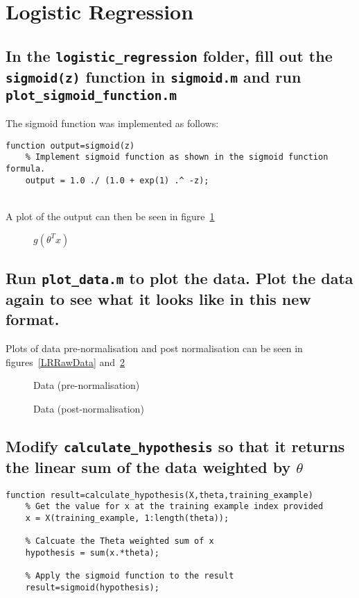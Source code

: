 \documentclass[titlepage]{scrartcl}
\newcommand{\code}[1]{\texttt{#1}}
\begin{document}
\section{Logistic Regression}
\subsection{In the \code{logistic\_regression} folder, fill out the
    \code{sigmoid(z)} function in \code{sigmoid.m} and run
\code{plot\_sigmoid\_function.m}}
The sigmoid function was implemented as follows:\\
\begin{lstlisting}
function output=sigmoid(z)
    % Implement sigmoid function as shown in the sigmoid function formula.
    output = 1.0 ./ (1.0 + exp(1) .^ -z);
\end{lstlisting}\leavevmode \\
A plot of the output can then be seen in figure~\ref{sigmoid}
\begin{figure}
    \caption{$g(\theta^Tx)$}
    \label{sigmoid}
\end{figure}

\subsection{Run \code{plot\_data.m} to plot the data. Plot the data again to
see what it looks like in this new format.}
Plots of data pre-normalisation and post normalisation can be seen in
figures~\ref{LRRawData} and~\ref{LRNormalisedData}

\begin{figure}
    \caption{Data (pre-normalisation)}
    \label{LRRawData}
    \caption{Data (post-normalisation)}
    \label{LRNormalisedData}
\end{figure}

\begin{minipage}{\linewidth}
\subsection{Modify \code{calculate\_hypothesis} so that it returns the
linear sum of the data weighted by $\theta$}
\begin{lstlisting}
function result=calculate_hypothesis(X,theta,training_example)
    % Get the value for x at the training example index provided
    x = X(training_example, 1:length(theta));

    % Calcuate the Theta weighted sum of x
    hypothesis = sum(x.*theta);

    % Apply the sigmoid function to the result
    result=sigmoid(hypothesis);
\end{lstlisting}\leavevmode \\
\end{minipage}
\end{document}

